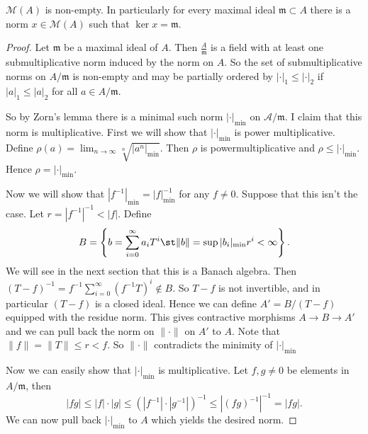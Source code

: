 \begin{proposition}
	$\mathcal{M} (A)$ is non-empty. 
	In particularly for every maximal ideal $\mathfrak{m}  \subset  A$ there is a norm $x \in \mathcal{M} (A)$ such that $\ker x = \mathfrak{m} $.
\end{proposition}
\begin{proof}
	Let $\mathfrak{m}$ be a maximal ideal of $A$. 
	Then $\frac{A}{\mathfrak{m} }$ is a field  with at least one submultiplicative norm induced by the norm on  $A$. 
	So the set of submultiplicative norms on  $A/\mathfrak{m} $ is non-empty and may be partially ordered by $|\cdot |_1 \le |\cdot |_2$ if $|a|_1 \le |a|_2$ for all $a \in A / \mathfrak{m} $. 

	So by Zorn's lemma there is a minimal such norm $|\cdot |_\text{min} $ on $\mathcal{A}  / \mathfrak{m} $. 
	I claim that this norm is multiplicative. 
	First we will show that $|\cdot |_\text{min} $ is power multiplicative. 
	Define $\rho(a) = \lim_{n \to \infty} \sqrt[n]{|a^{n}|_\text{min} } $. Then $\rho$ is powermultiplicative and $\rho \le |\cdot |_\text{min} $. Hence $\rho = |\cdot |_\text{min} $. 

	Now we will show that $|f^{-1}|_\text{min}  = |f|^{-1}_\text{min} $ for any $f \ne 0$. 
	Suppose that this isn't the case. Let  $r = |f^{-1}|^{-1} < |f|$. 
	Define \[
	B = \left\{b = \sum_{i = 0}^{\infty} a_i T^{i}\st \|b\|  =\sup |b_i|_\text{min}  r^{i} < \infty\right\} 
	.\] 
	We will see in the next section that this is a Banach algebra. Then $(T - f)^{-1} = f^{-1}\sum_{i = 0}^{\infty} (f^{-1} T)^{i} \not\in B $. So $T - f$ is not invertible, and in particular $(T - f)$ is a closed ideal. 
	Hence we can define $A' = B / (T - f)$ equipped with the residue norm. 
	This gives contractive morphisms  $A \to B \to A'$ and we can pull back the norm on $\|\cdot \|$ on $A'$ to $A$. 
	Note that $\|f\| = \|T\|  \le  r < f$. So $\|\cdot \|$ contradicts the minimity of $|\cdot |_\text{min} $

	Now we can easily show that $|\cdot |_\text{min} $ is multiplicative. 
	Let $f, g \ne 0$ be elements in $A / \mathfrak{m} $, then \[
		|fg| \le |f|\cdot |g| \le (|f^{-1}| \cdot |g^{-1}|)^{-1} \le |(fg)^{-1}|^{-1} = |fg|. 
	\]
	We can now pull back $|\cdot |_\text{min} $ to $A$ which yields the desired norm. 
\end{proof}

